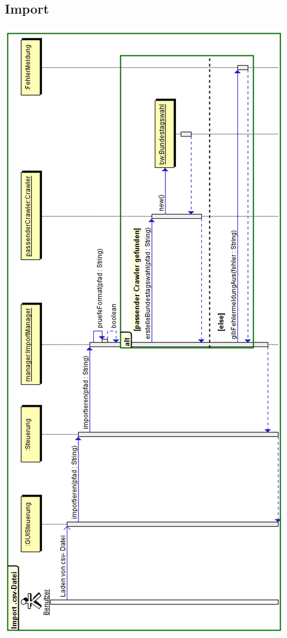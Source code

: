 \documentclass[12pt,a4paper,titlepage]{article}
\begin{document}
\subsection{Import}
\includegraphics[scale=0.7]{Import-Sequenzdiagramm.png} 
\end{document}
